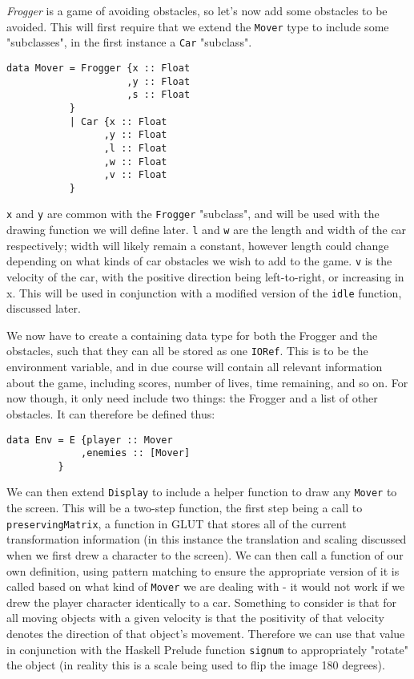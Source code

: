 \documentclass[12pt, a4paper]{report}
\begin{document}
\textit{Frogger} is a game of avoiding obstacles, so let's now add some obstacles to be avoided.
This will first require that we extend the \verb|Mover| type to include some "subclasses", in the first instance a \verb|Car| "subclass".

\begin{lstlisting}
data Mover = Frogger {x :: Float
                     ,y :: Float
                     ,s :: Float
           }
           | Car {x :: Float
                 ,y :: Float
                 ,l :: Float
                 ,w :: Float
                 ,v :: Float
           }
\end{lstlisting}

\verb|x| and \verb|y| are common with the \verb|Frogger| "subclass", and will be used with the drawing function we will define later.
\verb|l| and \verb|w| are the length and width of the car respectively; width will likely remain a constant, however length could change depending on what kinds of car obstacles we wish to add to the game.
\verb|v| is the velocity of the car, with the positive direction being left-to-right, or increasing in x.
This will be used in conjunction with a modified version of the \verb|idle| function, discussed later.


We now have to create a containing data type for both the Frogger and the obstacles, such that they can all be stored as one \verb|IORef|.
This is to be the environment variable, and in due course will contain all relevant information about the game, including scores, number of lives, time remaining, and so on.
For now though, it only need include two things: the Frogger and a list of other obstacles.
It can therefore be defined thus:

\begin{lstlisting}
data Env = E {player :: Mover
             ,enemies :: [Mover]
         }
\end{lstlisting}

We can then extend \verb|Display| to include a helper function to draw any \verb|Mover| to the screen.
This will be a two-step function, the first step being a call to \verb|preservingMatrix|, a function in GLUT that stores all of the current transformation information (in this instance the translation and scaling discussed when we first drew a character to the screen).
We can then call a function of our own definition, using pattern matching to ensure the appropriate version of it is called based on what kind of \verb|Mover| we are dealing with - it would not work if we drew the player character identically to a car.
Something to consider is that for all moving objects with a given velocity is that the positivity of that velocity denotes the direction of that object's movement.
Therefore we can use that value in conjunction with the Haskell Prelude function \verb|signum| to appropriately "rotate" the object (in reality this is a scale being used to flip the image 180 degrees).
\end{document}
